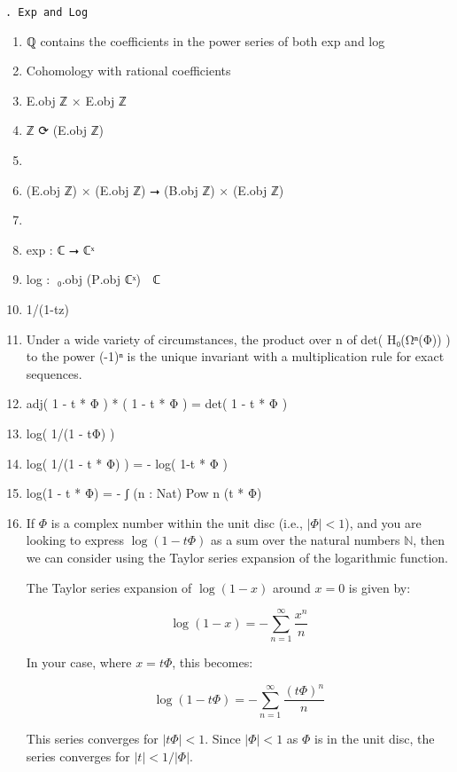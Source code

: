 \documentclass{book}
\newcounter{pcounter}
\newcounter{sectioncount}
\newcounter{subsectioncount}
\renewcommand{\subsection}[1]{\texttt{\thesubsectioncount . #1} \stepcounter{subsectioncount}}
\begin{document}
\subsection{Exp and Log}

\begin{enumerate}
\item ℚ contains the coefficients in the power series of both exp and log
\item Cohomology with rational coefficients
\item E.obj ℤ × E.obj ℤ
\item ℤ ⟳ (E.obj ℤ)
\item 
\item (E.obj ℤ) × (E.obj ℤ) ⭢ (B.obj ℤ) × (E.obj ℤ)
\item 
\item exp : ℂ ⭢ ℂˣ
\item log : π⃡₀.obj (P⃡.obj ℂˣ) ⭢ ℂ
\item 1/(1-tz)
\item Under a wide variety of circumstances, the product over n of det( H₀(Ωⁿ(Φ)) ) to the power (-1)ⁿ is the unique invariant with a multiplication rule for exact sequences.
\item adj( 1 - t * Φ ) * ( 1 - t * Φ ) = det( 1 - t * Φ )
\item log( 1/(1 - tΦ) )
\item log( 1/(1 - t * Φ) ) = - log( 1-t * Φ ) 
\item log(1 - t * Φ) = - ʃ (n : Nat)  Pow n (t * Φ)
\item If \(\Phi\) is a complex number within the unit disc (i.e., \(|\Phi| < 1\)), and you are looking to express \(\log(1 - t\Phi)\) as a sum over the natural numbers \(ℕ\), then we can consider using the Taylor series expansion of the logarithmic function.

The Taylor series expansion of \(\log(1 - x)\) around \(x = 0\) is given by:

\[
\log(1 - x) = -\sum_{n=1}^{\infty} \frac{x^n}{n}
\]

In your case, where \(x = t\Phi\), this becomes:

\[
\log(1 - t\Phi) = -\sum_{n=1}^{\infty} \frac{(t\Phi)^n}{n}
\]

This series converges for \(|t\Phi| < 1\). Since \(|\Phi| < 1\) as \(\Phi\) is in the unit disc, the series converges for \(|t| < 1/|\Phi|\).\\


\end{enumerate}
\end{document}
